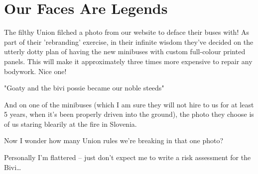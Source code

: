 \section{Our Faces Are Legends}

The filthy Union filched a photo from our website to deface their buses with! As part of their 'rebranding' exercise, in their infinite wisdom they've decided on the utterly dotty plan of having the new minibuses with
custom full-colour printed panels. This will make it approximately three times more expensive to repair any
bodywork. Nice one!

\begin{marginfigure}
      \checkoddpage \ifoddpage \forcerectofloat \else \forceversofloat \fi
      \centering
  \caption{"Goaty and the bivi possie became our noble steeds" }
\end{marginfigure}

And on one of the minibuses
(which I am sure they will not
hire to us for at least 5 years,
when it's been properly driven
into the ground), the photo
they choose is of us staring
blearily at the fire in Slovenia.

Now I wonder how many Union rules we're breaking in that one photo?

Personally I'm flattered – just
don't expect me to write a risk
assessment for the Bivi\ldots{}



